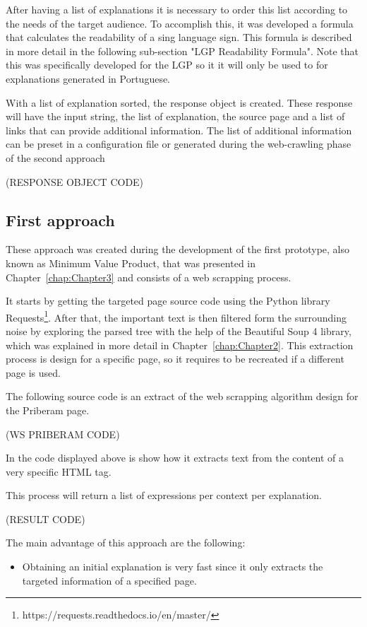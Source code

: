 After having a list of explanations it is necessary to order this list according to the needs of the target audience.
To accomplish this, it was developed a formula that calculates the readability of a sing language sign.
This formula is described in more detail in the following sub-section "LGP Readability Formula".
Note that this was specifically developed for the \gls{LGP} so it it will only be used to for explanations generated in Portuguese.

With a list of explanation sorted, the response object is created.
These response will have the input string, the list of explanation, the source page and a list of links that can provide additional information.
The list of additional information can be preset in a configuration file or generated during the web-crawling phase of the second approach

(RESPONSE OBJECT CODE) %

\subsection{First approach}

These approach was created during the development of the first prototype, also known as Minimum Value Product, that was presented in Chapter~\ref{chap:Chapter3} and consists of a web scrapping process.

It starts by getting the targeted page source code using the Python library Requests\footnote{https://requests.readthedocs.io/en/master/}.
After that, the important text is then filtered form the surrounding noise by exploring the parsed tree with the help of the Beautiful Soup 4 library, which was explained in more detail in Chapter~\ref{chap:Chapter2}.
This extraction process is design for a specific page, so it requires to be recreated if a different page is used.

The following source code is an extract of the web scrapping algorithm design for the Priberam page.

(WS PRIBERAM CODE) %

In the code displayed above is show how it extracts text from the content of a very specific HTML tag.

This process will return a list of expressions per context per explanation.

(RESULT CODE) %

The main advantage of this approach are the following:
\begin{itemize}
        \item Obtaining an initial explanation is very fast since it only extracts the targeted information of a specified page.
\end{itemize}

